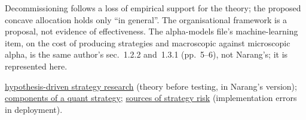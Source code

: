 \begin{qfmethod}
 Decommissioning follows a loss of empirical support for the theory; the proposed concave allocation holds only ``in general''. The organisational framework is a proposal, not evidence of effectiveness. The alpha-models file's machine-learning item, on the cost of producing strategies and macroscopic against microscopic alpha, is the same author's sec.~1.2.2 and~1.3.1 (pp.~5--6), not Narang's; it is represented here.

 \hyperref[meth:hypothesis-driven-strategy-research]{hypothesis-driven strategy research} (theory before testing, in Narang's version); \hyperref[def:quant-strategy-components]{components of a quant strategy}; \hyperref[def:quant-strategy-risk-sources]{sources of strategy risk} (implementation errors in deployment).

\end{qfmethod}

